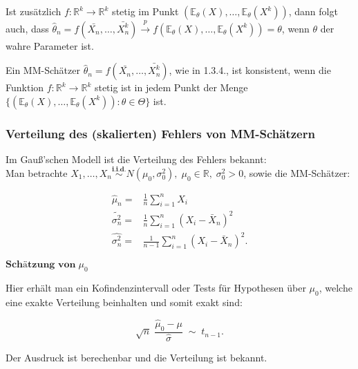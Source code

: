 \documentclass[10pt]{article}
\newcommand{\FZV}{X_1, \ldots, X_n} %
\newcommand{\IR}{\mathbb{R}} %
\newcommand{\EW}{\mathbb{E}} %
\begin{document}
\begin{enumerate}
	Ist zusätzlich $f: \IR^k \rightarrow \IR^k$ stetig im Punkt $(\EW_\theta(X),\ldots,\EW_\theta(X^k))$, dann folgt auch, dass $\hat{\theta}_n = f(\bar{X_n}, \ldots, \bar{X^k_n}) \overset{p} \rightarrow f(\EW_\theta(X),\ldots,\EW_\theta(X^k)) = \theta$, wenn $\theta$ der wahre Parameter ist. 

	\begin{Definition}
	Ein MM-Schätzer $\hat\theta_n = f(\bar{X_n},\ldots,\bar{X^k_n})$, wie in 1.3.4., ist konsistent, wenn die Funktion $f:\IR ^k \rightarrow \IR ^k$ stetig ist in jedem Punkt der Menge $\{(\EW_\theta(X),\ldots, \EW_\theta(X^k)) : \theta \in \Theta\}$ ist.	\end{Definition}

\end{enumerate}

\subsubsection{Verteilung des (skalierten) Fehlers von MM-Schätzern}

	Im Gauß'schen Modell ist die Verteilung des Fehlers bekannt: \\
	Man  betrachte $\FZV \overset{\textbf{i.i.d.}} {\sim} N(\mu_0,\sigma_0^2),\; \mu_0 \in \IR, \; \sigma_0^2 >0$, sowie die MM-Schätzer:
	
	\begin{equation*}
	\begin{split}
		\hat{\mu}_n =& \frac{1}{n}\sum_{i=1}^{n} X_i\\
		\tilde{\sigma^2_n} =&\frac{1}{n}\sum_{i=1}^{n} (X_i - \bar{X}_n)^2\\
		\hat{\sigma^2_n}=&\frac{1}{n-1}\sum_{i=1}^{n} (X_i - \bar{X}_n)^2.
	\end{split}
	\end{equation*}
	
		\noindent $\textbf{Schätzung von} \; \mu_0$
	
		\noindent Hier  erhält man ein Kofindenzintervall oder Tests für Hypothesen über $\mu_0$, welche eine exakte Verteilung beinhalten und somit exakt sind:
	
	\begin{equation*}
		\sqrt{n} \; \frac{\hat{\mu}_0 - \mu}{\hat{\sigma}} \;{\sim}\; t_{n-1}.
	\end{equation*}
	
		\noindent Der Ausdruck ist berechenbar und die Verteilung ist bekannt.\\
\end{document}
